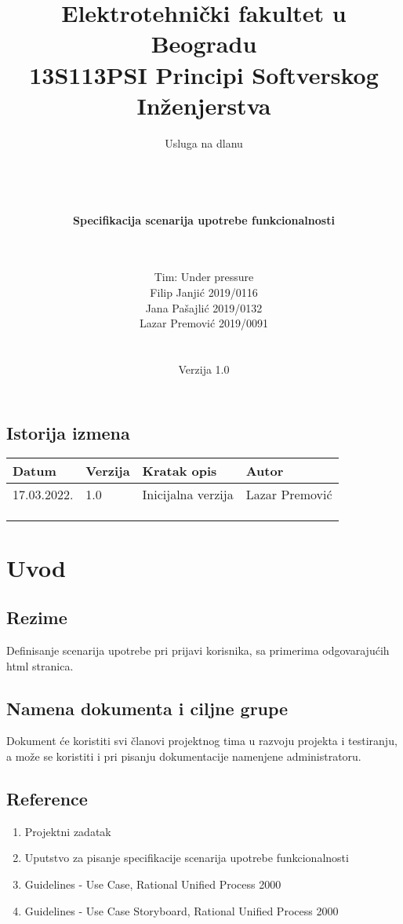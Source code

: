 \documentclass[a4paper,12pt]{report}
\title{\Large Elektrotehnički fakultet u Beogradu \\ 13S113PSI Principi Softverskog Inženjerstva}
\author{\Huge Usluga na dlanu\\ \ \\ \ \\ \ \\ \ \\
	\Large \textbf{Specifikacija scenarija upotrebe funkcionalnosti}\\\Large \textbf{\genitivfunkcionalnosti} \\ \ \\}
\date{\Large   Tim: Under pressure \\ Filip Janjić 2019/0116 \\ Jana Pašajlić 2019/0132 \\ Lazar Premović 2019/0091  \\ \  \\ \  \\
	\large Verzija 1.0}
\newcommand{\dativfunkcionalnosti }{prijavi korisnika}
\newcommand{\inicijalniautor}{Lazar Premović}
\newcommand{\inicijalnidatum}{17.03.2022.}
\begin{document}
	
	\maketitle
	
	\begin{center}
		\section*{Istorija izmena}
			\begin{tabular}{ |l|l|l|l| }
				\hline
				\textbf{Datum} & \textbf{Verzija} & \textbf{Kratak opis} & \textbf{Autor} \\ 
				\hline
				\inicijalnidatum & 1.0  & Inicijalna verzija & \inicijalniautor \\
				\hline
				&  & &  \\
				\hline
				&  &  &  \\
				\hline
				&  &  &  \\
				\hline
			\end{tabular}
	\end{center}
	
	\newpage
	
	\tableofcontents
	
	\newpage
	
	\section{Uvod}
		\subsection{Rezime}
			Definisanje scenarija upotrebe pri \dativfunkcionalnosti, sa primerima odgovarajućih html stranica.
		\subsection{Namena dokumenta i ciljne grupe}
			Dokument će koristiti svi članovi projektnog tima u razvoju projekta i testiranju, a može se koristiti i pri pisanju dokumentacije namenjene administratoru.
		\subsection{Reference}
			\begin{enumerate}
				\item Projektni zadatak
				\item Uputstvo za pisanje specifikacije scenarija upotrebe funkcionalnosti
				\item Guidelines - Use Case, Rational Unified Process 2000
				\item Guidelines - Use Case Storyboard, Rational Unified Process 2000
			\end{enumerate}
\end{document}
